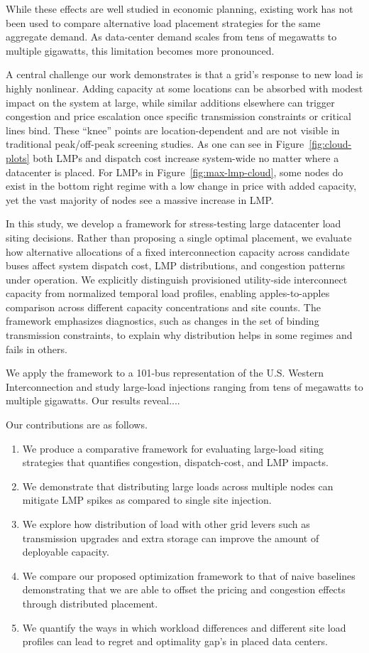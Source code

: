 While these effects are well
studied in economic planning, existing work has not been used to compare 
alternative load placement strategies for the same aggregate demand. As data-center 
demand scales from tens of megawatts to multiple gigawatts, this limitation becomes 
more pronounced.

A central challenge our work demonstrates is that a grid's response to new load is highly nonlinear. Adding capacity at some
locations can be absorbed with modest impact on the system at large, while similar additions elsewhere can
trigger congestion and price escalation once specific transmission constraints or critical lines bind. These ``knee''
points are location-dependent and are not visible in traditional peak/off-peak screening studies. 
As one can see in Figure~\ref{fig:cloud-plots} both LMPs and dispatch cost increase 
system-wide no matter where a datacenter is placed. For LMPs in Figure~\ref{fig:max-lmp-cloud}, 
some nodes do exist in the bottom right regime with a low change in price with added 
capacity, yet the vast majority of nodes see a massive increase in LMP.


In this study, we develop a framework for stress-testing large datacenter load siting
decisions. Rather than proposing a single optimal placement, we evaluate how alternative allocations of
a fixed interconnection capacity across candidate buses affect system dispatch cost, LMP distributions,
and congestion patterns under operation. We explicitly distinguish provisioned utility-side interconnect capacity from normalized temporal load profiles, enabling apples-to-apples
comparison across different capacity concentrations and site counts. The framework emphasizes
diagnostics, such as changes in the set of binding transmission constraints, to explain why
distribution helps in some regimes and fails in others.

We apply the framework to a 101-bus representation of the U.S. Western Interconnection and study
large-load injections ranging from tens of megawatts to multiple gigawatts. Our results reveal....

Our contributions are as follows.
\begin{enumerate}
    \item We produce a comparative framework for evaluating large-load siting strategies that quantifies congestion, dispatch-cost, and LMP impacts.
    \item We demonstrate that distributing large loads across multiple nodes can mitigate LMP spikes as compared to single site injection.
    \item We explore how distribution of load with other grid levers such as transmission upgrades and extra storage can improve the amount of deployable capacity.
    \item We compare our proposed optimization framework to that of naive baselines demonstrating that we are able to offset the pricing and congestion effects through distributed placement.
    \item We quantify the ways in which workload differences and different site load profiles can lead to regret and optimality gap's in placed data centers.
\end{enumerate}
